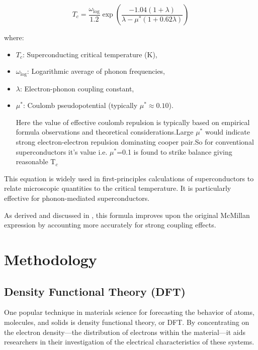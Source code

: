 \documentclass[12pt,a4paper]{article}
\begin{document}
\[
T_c = \frac{\omega_{\log}}{1.2} \exp\left(
\frac{-1.04(1+\lambda)}{\lambda - \mu^*(1 + 0.62\lambda)}
\right)
\]

\noindent where:
\begin{itemize}
    \item \( T_c \): Superconducting critical temperature (K),
    \item \( \omega_{\log} \): Logarithmic average of phonon frequencies,
    \item \( \lambda \): Electron-phonon coupling constant,
    \item \( \mu^* \): Coulomb pseudopotential (typically \( \mu^* \approx 0.10 \)).\\
    \par
    \vspace{2mm}
    Here the value of effective coulomb repulsion is typically based on empirical formula observations and theoretical considerations.Large   \( \mu^* \) would indicate strong electron-electron repulsion dominating cooper pair.So for conventional superconductors it's value i.e.  \( \mu^* \)=0.1 is found to strike balance giving reasonable T$_c$
    
\end{itemize}

This equation is widely used in first-principles calculations of superconductors to relate microscopic quantities to the critical temperature. It is particularly effective for phonon-mediated superconductors.

As derived and discussed in \cite{allen1975}, this formula improves upon the original McMillan expression by accounting more accurately for strong coupling effects.
\pagebreak



\section{Methodology}
\subsection{Density Functional Theory (DFT)}



One popular technique in materials science for forecasting the behavior of atoms, molecules, and solids is density functional theory, or DFT. By concentrating on the electron density—the distribution of electrons within the material—it aids researchers in their investigation of the electrical characteristics of these systems.
\end{document}
